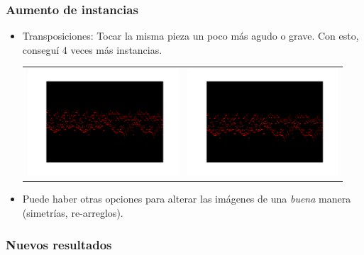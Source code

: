 \documentclass{beamer}
\theoremstyle{plain}
\numberwithin{equation}{section} %
\numberwithin{figure}{section} %
\numberwithin{table}{section} %
\begin{document}
\begin{frame}
\frametitle{Aumento de instancias}

\begin{itemize}
\justifying 

\item Transposiciones: Tocar la misma pieza un poco m\'as agudo o grave. Con esto, consegu\'i 4 veces m\'as instancias.

\begin{table}[h!]
\begin{center}
\begin{tabular}{cc}

\begin{minipage}{.4\textwidth}
\includegraphics[width=\linewidth, height=40mm]{T-root.png}
\end{minipage}

 &
\begin{minipage}{.4\textwidth}
\includegraphics[width=\linewidth, height=40mm]{T-5d.png}
\end{minipage}
\\
\end{tabular}
\end{center}
\end{table}

\item Puede haber otras opciones para alterar las im\'agenes de una \emph{buena} manera (simetr\'ias, re-arreglos).

\end{itemize}

\end{frame}


\begin{frame}
\frametitle{Nuevos resultados}


\end{frame}

\end{document}

